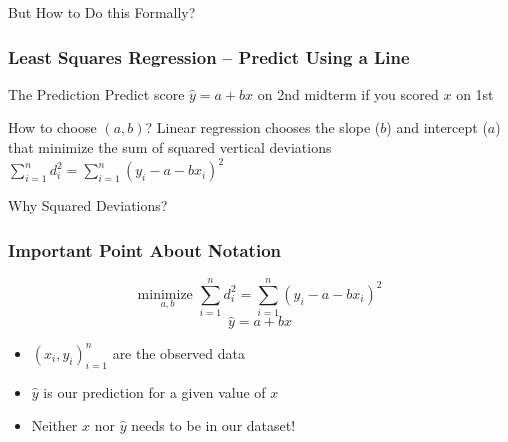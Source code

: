 \documentclass[handout]{beamer}
\begin{document}
\begin{frame}

\centering \Huge But How to Do this Formally?


\end{frame}
\begin{frame}
\frametitle{Least Squares Regression -- Predict Using a Line}

\begin{block}{The Prediction}
Predict score $\hat{y} = a + b x$ on 2nd midterm if you scored $x$ on 1st
\end{block}

\begin{block}{How to choose $(a,b)$?}
  Linear regression chooses the slope ($b$) and intercept ($a$) that \alert{minimize the sum of squared vertical deviations}
$\displaystyle\sum_{i = 1}^n d_i^2 = \sum_{i=1}^n (y_i - a - b x_i)^2$
\end{block}

\begin{block}{Why Squared Deviations?}
\end{block}
\end{frame}
\begin{frame}
	\frametitle{Important Point About Notation}
  $$\boxed{\underset{a,b}{\mbox{minimize }}\sum_{i = 1}^n d_i^2 = \sum_{i=1}^n (y_i - a - b x_i)^2}$$
			$$\boxed{\hat{y} = a + bx}$$
		\begin{itemize}
		\item $(x_i, y_i)_{i=1}^n$ are the \alert{observed data}
		\item $\widehat{y}$ is our \alert{prediction} for a given value of $x$
		\item Neither $x$ nor $\widehat{y}$ needs to be in our dataset!
	\end{itemize}
\end{frame}
\end{document}
